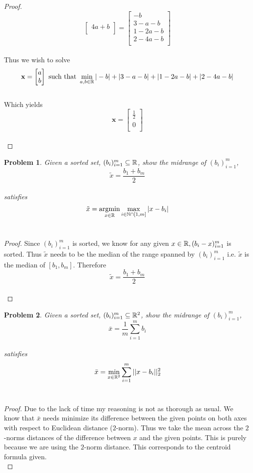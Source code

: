 \documentclass[12pt,oneside]{amsart}
\numberwithin{equation}{section}
\numberwithin{figure}{section}
\theoremstyle{plain}
\newtheorem{prob}{Problem}
\theoremstyle{definition}
\newcommand{\R}{\ensuremath \mathbb{R}}
\newcommand{\N}{\ensuremath \mathbb{N}}
\DeclareMathOperator{\argmin}{argmin}
\begin{document}
\begin{proof}
\[\begin{bmatrix}
4a + b \\
\end{bmatrix} = \begin{bmatrix}
-b \\
3 - a - b \\
1 - 2a - b \\
2 - 4a - b \\
\end{bmatrix}\] \\
Thus we wish to solve \\
\[\mathbf{x} = \begin{bmatrix}
a \\
b \\
\end{bmatrix} \text{ such that } \min_{a,b \in \R} |-b| + |3-a-b| + |1-2a-b| + 
|2-4a-b|\] \\
Which yields \\
\[\mathbf{x} = \begin{bmatrix}
  \frac{1}{2} \\
  0 \\
\end{bmatrix}\] \\
\end{proof}

\begin{prob}
Given a sorted set, $(b_i)_{i=1}^{m} \subseteq \R$, show the midrange of 
$(b_i)_{i=1}^{m}$, \\
\[\tilde x = \frac{b_1 + b_m}{2}\] \\
satisfies \\
\[\tilde x = \argmin_{x \in \R}\max_{i \in \N \cap [1,m]}|x - b_i|\] \\
\end{prob}
\begin{proof}
Since $(b_i)_{i=1}^{m}$ is sorted, we know for any given $x \in \R, (b_i - x)_{i=1}^{m}$ 
is sorted. Thus $\tilde x$ needs to be the median of the range spanned by $(b_i)_{i=1}^{m}$ 
i.e. $\tilde x$ is the median of $[b_1,b_m]$. Therefore \\
\[\tilde x = \frac{b_1 + b_m}{2}\] \\
\end{proof}

\begin{prob}
Given a sorted set, $(b_i)_{i=1}^{m} \subseteq \R^2$, show the midrange of 
$(b_i)_{i=1}^{m}$, \\
\[\bar x = \frac{1}{m}\sum_{i=1}^{m}b_i\] \\
satisfies \\
\[\bar x = \min_{x \in \R^2}\sum_{i=1}^{m}||x - b_i||_2^2\] \\
\end{prob}
\begin{proof}
Due to the lack of time my reasoning is not as thorough as usual. We know that 
$\bar x$ needs minimize its difference between the given points on both axes with 
respect to Euclidean distance ($2$-norm). Thus we take the mean across the 
$2$-norms distances of the difference between $x$ and the given points. This is 
purely because we are using the $2$-norm distance. This corresponds to the 
centroid formula given. \\
\end{proof}
\end{document}
